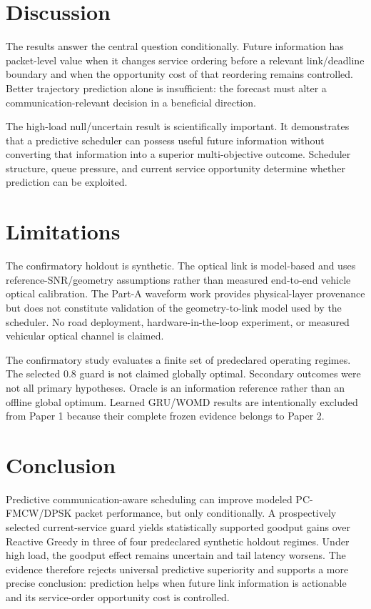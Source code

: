 \documentclass[conference]{IEEEtran}
\begin{document}
\section{Discussion}
The results answer the central question conditionally. Future information has packet-level value when it changes service ordering before a relevant link/deadline boundary and when the opportunity cost of that reordering remains controlled. Better trajectory prediction alone is insufficient: the forecast must alter a communication-relevant decision in a beneficial direction.

The high-load null/uncertain result is scientifically important. It demonstrates that a predictive scheduler can possess useful future information without converting that information into a superior multi-objective outcome. Scheduler structure, queue pressure, and current service opportunity determine whether prediction can be exploited.

\section{Limitations}
The confirmatory holdout is synthetic. The optical link is model-based and uses reference-SNR/geometry assumptions rather than measured end-to-end vehicle optical calibration. The Part-A waveform work provides physical-layer provenance but does not constitute validation of the geometry-to-link model used by the scheduler. No road deployment, hardware-in-the-loop experiment, or measured vehicular optical channel is claimed.

The confirmatory study evaluates a finite set of predeclared operating regimes. The selected 0.8 guard is not claimed globally optimal. Secondary outcomes were not all primary hypotheses. Oracle is an information reference rather than an offline global optimum. Learned GRU/WOMD results are intentionally excluded from Paper 1 because their complete frozen evidence belongs to Paper 2.

\section{Conclusion}
Predictive communication-aware scheduling can improve modeled PC-FMCW/DPSK packet performance, but only conditionally. A prospectively selected current-service guard yields statistically supported goodput gains over Reactive Greedy in three of four predeclared synthetic holdout regimes. Under high load, the goodput effect remains uncertain and tail latency worsens. The evidence therefore rejects universal predictive superiority and supports a more precise conclusion: prediction helps when future link information is actionable and its service-order opportunity cost is controlled.
\end{document}
